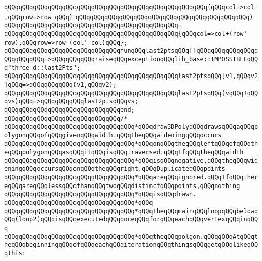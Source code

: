 \verb|qQQqqQQqqQQqqQQqqQQqqQQqqQQqqQQqqQQqqQQqqQQqqQQqqQQqqQQq{qQQqcol=>col',qQQqrow=>row'qQQq}|\newline
\verb|qQQqqQQqqQQqqQQqqQQqqQQqqQQqqQQqqQQqqQQqqQQqqQQq)|\newline
\verb|qQQqqQQqqQQqqQQqqQQqqQQqqQQqqQQqqQQqqQQqqQQqqQQq=|\newline
\verb|qQQqqQQqqQQqqQQqqQQqqQQqqQQqqQQqqQQqqQQqqQQqqQQq{qQQqcol=>col+(row'-row),qQQqrow=>row-(col'-col)qQQq};|\newline
\newline
\newline
\verb|qQQqqQQqqQQqqQQqqQQqqQQqqQQqqQQqfunqQQqlast2ptsqQQq[]qQQqqQQqqQQqqQQqqQQqqQQqqQQq=>qQQqqQQqqQQqraiseqQQqexceptionqQQqlib_base::IMPOSSIBLEqQQq"three_d::last2Pts";|\newline
\verb|qQQqqQQqqQQqqQQqqQQqqQQqqQQqqQQqqQQqqQQqqQQqqQQqlast2ptsqQQq[v1,qQQqv2]qQQq=>qQQqqQQqqQQq(v1,qQQqv2);|\newline
\verb|qQQqqQQqqQQqqQQqqQQqqQQqqQQqqQQqqQQqqQQqqQQqqQQqlast2ptsqQQq(vqQQq!qQQqvs)qQQq=>qQQqqQQqqQQqlast2ptsqQQqvs;|\newline
\verb|qQQqqQQqqQQqqQQqqQQqqQQqqQQqqQQqend;|\newline
\newline
\verb|qQQqqQQqqQQqqQQqqQQqqQQqqQQqqQQq/*|\newline
\verb|qQQqqQQqqQQqqQQqqQQqqQQqqQQqqQQqqQQq*qQQqdraw3DPolyqQQqdrawsqQQqaqQQqpolygonqQQqofqQQqgivenqQQqwidth.qQQqTheqQQqwideningqQQqoccurs|\newline
\verb|qQQqqQQqqQQqqQQqqQQqqQQqqQQqqQQqqQQq*qQQqonqQQqtheqQQqleftqQQqofqQQqtheqQQqpolygonqQQqasqQQqitqQQqisqQQqtraversed.qQQqIfqQQqtheqQQqwidth|\newline
\verb|qQQqqQQqqQQqqQQqqQQqqQQqqQQqqQQqqQQq*qQQqisqQQqnegative,qQQqtheqQQqwideningqQQqoccursqQQqonqQQqtheqQQqright.qQQqDuplicateqQQqpoints|\newline
\verb|qQQqqQQqqQQqqQQqqQQqqQQqqQQqqQQqqQQq*qQQqareqQQqignored.qQQqIfqQQqthereqQQqareqQQqlessqQQqthanqQQqtwoqQQqdistinctqQQqpoints,qQQqnothing|\newline
\verb|qQQqqQQqqQQqqQQqqQQqqQQqqQQqqQQqqQQq*qQQqisqQQqdrawn.|\newline
\verb|qQQqqQQqqQQqqQQqqQQqqQQqqQQqqQQqqQQq*qQQq|\newline
\verb|qQQqqQQqqQQqqQQqqQQqqQQqqQQqqQQqqQQq*qQQqTheqQQqmainqQQqloopqQQqbelowqQQq(loop2)qQQqisqQQqexecutedqQQqonceqQQqforqQQqeachqQQqvertexqQQqinqQQq|\newline
\verb|qQQqqQQqqQQqqQQqqQQqqQQqqQQqqQQqqQQq*qQQqtheqQQqpolgon.qQQqqQQqAtqQQqtheqQQqbeginningqQQqofqQQqeachqQQqiterationqQQqthingsqQQqgetqQQqlikeqQQqthis:|\newline

